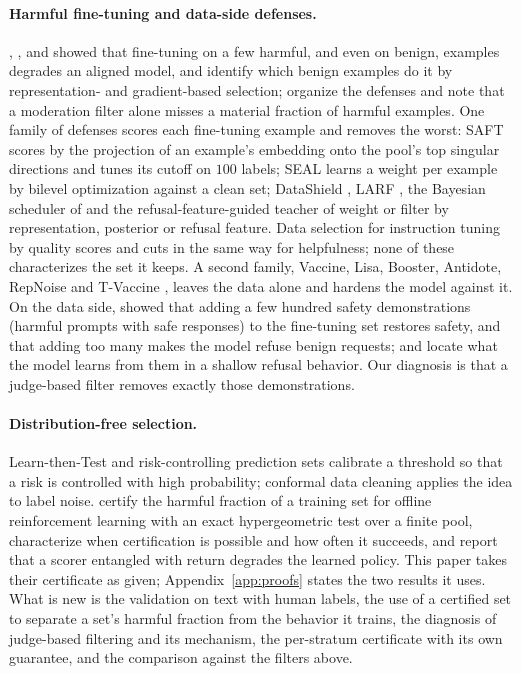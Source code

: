 \documentclass{article} %
\begin{document}
\paragraph{Harmful fine-tuning and data-side defenses.} \citet{qi2024finetuning}, \citet{yang2023shadow}, \citet{lermen2023lora} and \citet{zhan2024removing} showed that fine-tuning on a few harmful, and even on benign, examples degrades an aligned model, and \citet{he2024safedata} identify which benign examples do it by representation- and gradient-based selection; \citet{huang2024survey} organize the defenses and note that a moderation filter alone misses a material fraction of harmful examples. One family of defenses scores each fine-tuning example and removes the worst: SAFT \citep{choi2024saft} scores by the projection of an example's embedding onto the pool's top singular directions and tunes its cutoff on $100$ labels; SEAL \citep{shen2025seal} learns a weight per example by bilevel optimization against a clean set; DataShield \citep{zhang2026datashield}, LARF \citep{larf2025}, the Bayesian scheduler of \citet{hu2025bds} and the refusal-feature-guided teacher of \citet{ham2025reft} weight or filter by representation, posterior or refusal feature. Data selection for instruction tuning by quality \citep{zhou2023lima, liu2024deita, xia2024less, li2024ifd} scores and cuts in the same way for helpfulness; none of these characterizes the set it keeps. A second family, Vaccine, Lisa, Booster, Antidote, RepNoise and T-Vaccine \citep{huang2024vaccine, huang2024lisa, huang2025booster, huang2024antidote, rosati2024repnoise, liu2025tvaccine}, leaves the data alone and hardens the model against it. On the data side, \citet{bianchi2024safetytuned} showed that adding a few hundred safety demonstrations (harmful prompts with safe responses) to the fine-tuning set restores safety, and that adding too many makes the model refuse benign requests; \citet{zhao2025harmrefusal} and \citet{qi2025shallow} locate what the model learns from them in a shallow refusal behavior. Our diagnosis is that a judge-based filter removes exactly those demonstrations.
\paragraph{Distribution-free selection.} Learn-then-Test \citep{angelopoulos2025ltt} and risk-controlling prediction sets \citep{bates2021rcps, angelopoulos2024crc} calibrate a threshold so that a risk is controlled with high probability; conformal data cleaning \citep{zhan2023conformalclean} applies the idea to label noise. \citet{haroon2026certified} certify the harmful fraction of a training set for offline reinforcement learning with an exact hypergeometric test over a finite pool, characterize when certification is possible and how often it succeeds, and report that a scorer entangled with return degrades the learned policy. This paper takes their certificate as given; Appendix~\ref{app:proofs} states the two results it uses. What is new is the validation on text with human labels, the use of a certified set to separate a set's harmful fraction from the behavior it trains, the diagnosis of judge-based filtering and its mechanism, the per-stratum certificate with its own guarantee, and the comparison against the filters above.
\end{document}
